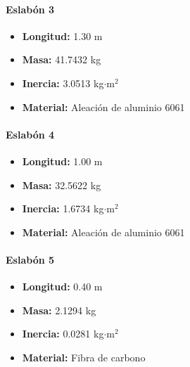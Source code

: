 \paragraph{Eslabón 3}
\begin{itemize}
	\item \textbf{Longitud:} 1.30 m
	\item \textbf{Masa:} 41.7432 kg
	\item \textbf{Inercia:} 3.0513 kg$\cdot$m$^2$
	\item \textbf{Material:} Aleación de aluminio 6061
\end{itemize}

\paragraph{Eslabón 4}
\begin{itemize}
	\item \textbf{Longitud:} 1.00 m
	\item \textbf{Masa:} 32.5622 kg
	\item \textbf{Inercia:} 1.6734 kg$\cdot$m$^2$
	\item \textbf{Material:} Aleación de aluminio 6061
\end{itemize}

\paragraph{Eslabón 5}
\begin{itemize}
	\item \textbf{Longitud:} 0.40 m
	\item \textbf{Masa:} 2.1294 kg
	\item \textbf{Inercia:} 0.0281 kg$\cdot$m$^2$
	\item \textbf{Material:} Fibra de carbono
\end{itemize}


